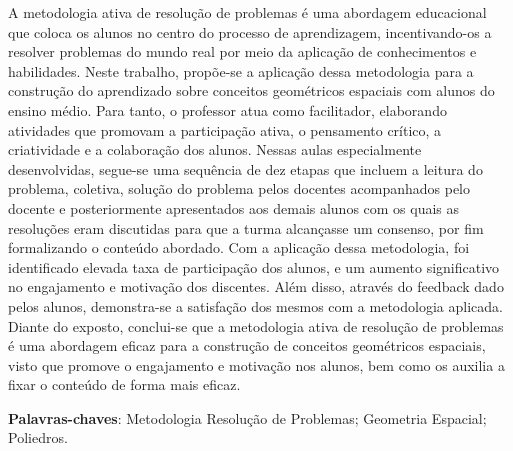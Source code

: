 
\setlength{\absparsep}{18pt} %
\begin{resumo}

    A metodologia ativa de resolução de problemas é uma abordagem educacional que coloca os alunos no centro do processo de aprendizagem, incentivando-os a resolver problemas do mundo real por meio da aplicação de conhecimentos e habilidades. Neste trabalho, propõe-se a aplicação dessa metodologia para a construção do aprendizado sobre conceitos geométricos espaciais com alunos do ensino médio. Para tanto, o professor atua como facilitador, elaborando atividades que promovam a participação ativa, o pensamento crítico, a criatividade e a colaboração dos alunos. Nessas aulas especialmente desenvolvidas, segue-se uma sequência de dez etapas que incluem a leitura do problema, coletiva, solução do problema pelos docentes acompanhados pelo docente e posteriormente apresentados aos demais alunos com os quais as resoluções eram discutidas para que a turma alcançasse um consenso, por fim formalizando o conteúdo abordado. Com a aplicação dessa metodologia, foi identificado elevada taxa de participação dos alunos, e um aumento significativo no engajamento e motivação dos discentes. Além disso, através do feedback dado pelos alunos, demonstra-se a satisfação dos mesmos com a metodologia aplicada. Diante do exposto, conclui-se que a metodologia ativa de resolução de problemas é uma abordagem eficaz para a construção de conceitos geométricos espaciais, visto que promove o engajamento e motivação nos alunos, bem como os auxilia a fixar o conteúdo de forma mais eficaz.

    \textbf{Palavras-chaves}:  Metodologia Resolução de Problemas; Geometria Espacial; Poliedros.

\end{resumo}

